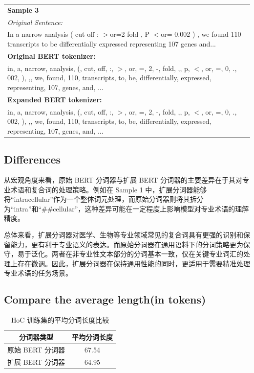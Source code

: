 \documentclass[12pt,letterpaper]{article}
\begin{document}
\begin{longtable}{|p{}|}
	\textbf{Sample 3} \\
	\textit{Original Sentence:} \\
	In a narrow analysis ( cut off : $>$or=2-fold , P $<$or= 0.002 ) , we found 110 transcripts to be differentially expressed representing 107 genes and... \\
	\textbf{Original BERT tokenizer:} \\
	in, a, narrow, analysis, (, cut, off, :, $>$, or, =, 2, -, fold, ,, p, $<$, or, =, 0, ., 002, ), ,, we, found, 110, transcripts, to, be, differentially, expressed, representing, 107, genes, and, ... \\
	\textbf{Expanded BERT tokenizer:} \\
	in, a, narrow, analysis, (, cut, off, :, $>$, or, =, 2, -, fold, ,, p, $<$, or, =, 0, ., 002, ), ,, we, found, 110, transcripts, to, be, differentially, expressed, representing, 107, genes, and, ... \\
	\hline
\end{longtable}

\subsection*{Differences}

从宏观角度来看，原始 BERT 分词器与扩展 BERT 分词器的主要差异在于其对专业术语和复合词的处理策略。例如在 Sample 1 中，扩展分词器能够将“intracellular”作为一个整体词元处理，而原始分词器则将其拆分为“intra”和“\#\#cellular”，这种差异可能在一定程度上影响模型对专业术语的理解精度。

总体来看，扩展分词器对医学、生物等专业领域常见的复合词具有更强的识别和保留能力，更有利于专业语义的表达。而原始分词器在通用语料下的分词策略更为保守，易于泛化。两者在非专业性文本部分的分词基本一致，仅在关键专业词汇的处理上存在微调。因此，扩展分词器在保持通用性能的同时，更适用于需要精准处理专业术语的任务场景。

\subsection*{Compare the average length(in tokens)}

\begin{table}[htbp]
	\centering
	\begin{tabular}{|c|c|}
		\hline
		\textbf{分词器类型} & \textbf{平均分词长度} \\
		\hline
		原始 BERT 分词器 & 67.54 \\
		扩展 BERT 分词器 & 64.95 \\
		\hline
	\end{tabular}
	\caption{HoC 训练集的平均分词长度比较}
\end{table}
\end{document}

